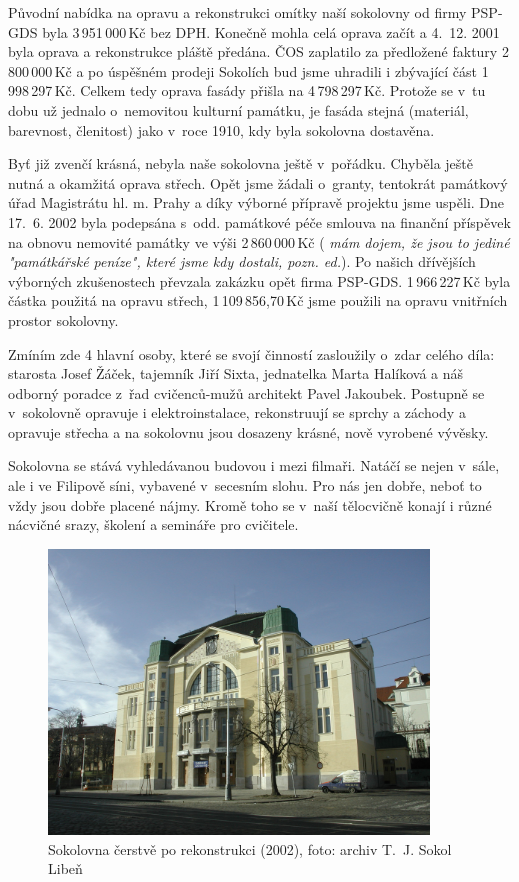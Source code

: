 \documentclass[a5paper, 11pt, twoside]{article}
\newcommand{\pozned}[1]{%
\textit{#1}}
\begin{document}
Původní nabídka na opravu a rekonstrukci omítky naší sokolovny od firmy
PSP-GDS byla 3\,951\,000\,Kč bez DPH. Konečně mohla celá oprava začít a 4.~12. 2001 byla oprava a rekonstrukce pláště předána. ČOS zaplatilo za
předložené faktury 2\,800\,000\,Kč a po úspěšném prodeji Sokolích bud jsme
uhradili i zbývající část 1\,998\,297\,Kč. Celkem tedy oprava fasády přišla
na 4\,798\,297\,Kč. Protože se v~tu dobu už jednalo o~nemovitou kulturní
památku, je fasáda stejná (materiál, barevnost, členitost) jako v~roce
1910, kdy byla sokolovna dostavěna.

Byť již zvenčí krásná, nebyla naše sokolovna ještě v~pořádku. Chyběla
ještě nutná a okamžitá oprava střech. Opět jsme žádali o~granty,
tentokrát památkový úřad Magistrátu hl. m. Prahy a díky výborné přípravě
projektu jsme uspěli. Dne 17.~6. 2002 byla podepsána s~odd. památkové
péče smlouva na finanční příspěvek na obnovu nemovité památky ve výši 2\,860\,000\,Kč (\pozned{mám dojem, že jsou to jediné "památkářské peníze",
které jsme kdy dostali, pozn. ed.}). Po našich dřívějších výborných
zkušenostech převzala zakázku opět firma PSP-GDS. 1\,966\,227\,Kč byla
částka použitá na opravu střech, 1\,109\,856,70\,Kč jsme použili na opravu
vnitřních prostor sokolovny.

Zmíním zde 4 hlavní osoby, které se svojí činností zasloužily o~zdar
celého díla: starosta Josef Žáček, tajemník Jiří Sixta, jednatelka Marta
Halíková a náš odborný poradce z~řad cvičenců-mužů architekt Pavel
Jakoubek. Postupně se v~sokolovně opravuje i elektroinstalace,
rekonstruují se sprchy a záchody a opravuje střecha a na sokolovnu jsou
dosazeny krásné, nově vyrobené vývěsky.

Sokolovna se stává vyhledávanou budovou i mezi filmaři. Natáčí se nejen
v~sále, ale i ve Filipově síni, vybavené v~secesním slohu. Pro nás jen
dobře, neboť to vždy jsou dobře placené nájmy. Kromě toho se v~naší
tělocvičně konají i různé nácvičné srazy, školení a semináře pro
cvičitele.

\begin{figure}[h!]
  \centering 
  \includegraphics[width=0.9\textwidth]{img/46_sokolovna.jpg}
  \caption*{Sokolovna čerstvě po rekonstrukci (2002), foto: archiv T.~J. Sokol
  Libeň}
\end{figure}
\end{document}
